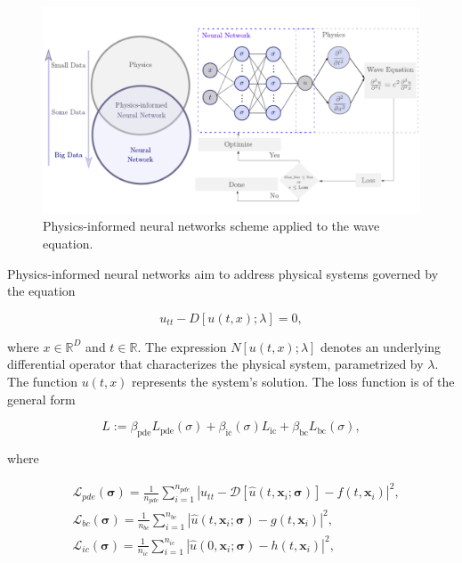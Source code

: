 \documentclass[11pt,twoside]{article}
\begin{document}
\begin{figure}[h]
\centering
    \includegraphics[width=1.0\textwidth]{figs/scheme_pinns_waves.pdf}
    \caption{Physics-informed neural networks scheme applied to the wave equation.}
    \label{deep_learning_subset_architecture}
\end{figure}

Physics-informed neural networks aim to address physical systems governed by the equation

$$
u_{tt} - D[u(t, x); \lambda] = 0,
$$

where \(x \in \mathbb{R}^D\) and \(t \in \mathbb{R}\). The expression \(N[u(t, x); \lambda]\) denotes 
an underlying differential operator that characterizes the physical system, parametrized by \(\lambda\). 
The function \(u(t, x)\) represents the system's solution. The loss function is of the general form 

$$ L := \beta_{\text{pde}}L_{\text{pde}}(\sigma) + \beta_{\text{ic}}(\sigma) L_{\text{ic}} + 
\beta_{\text{bc}} L_{\text{bc}}(\sigma) ,$$

where

$$
\begin{aligned}
& \mathcal{L}_{pde}(\boldsymbol{\sigma})=\frac{1}{n_{pde}} \sum_{i=1}^{n_{pde}}\left|u_{tt} - \mathcal{D}\left[\hat{u}\left(t,
 \boldsymbol{x}_i ; \boldsymbol{\sigma}\right)\right]-f\left(t, \boldsymbol{x}_i\right)\right|^2, \\
& \mathcal{L}_{bc}(\boldsymbol{\sigma})=\frac{1}{n_{bc}} \sum_{i=1}^{n_{bc}}\left|\hat{u}\left(t, \boldsymbol{x}_i ;
 \boldsymbol{\sigma}\right)-g\left(t, \boldsymbol{x}_i\right)\right|^2, \\
& \mathcal{L}_{ic}(\boldsymbol{\sigma})=\frac{1}{n_{ic}} \sum_{i=1}^{n_{ic}}\left|\hat{u}\left(0, \boldsymbol{x}_i ;
 \boldsymbol{\sigma}\right)-h\left(t,\boldsymbol{x}_i\right)\right|^2,
\end{aligned}
$$
\end{document}

